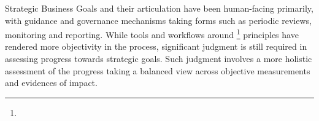 %
%

Strategic Business Goals and their articulation have been human-facing primarily,
with guidance and governance mechanisms taking forms such as periodic reviews, monitoring and reporting.
While tools and workflows around \footnote{} principles have rendered more objectivity
in the process, significant judgment is still required in assessing progress towards strategic goals.
Such judgment involves a more holistic assessment of the progress taking a balanced view across objective measurements
and evidences of impact.

